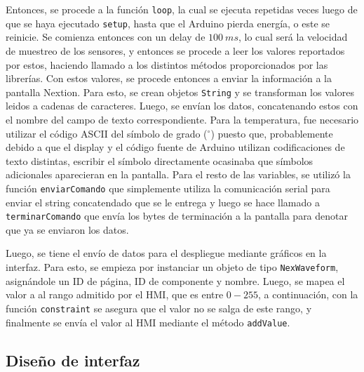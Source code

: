 Entonces, se procede a la función \texttt{loop}, la cual se ejecuta repetidas
veces luego de que se haya ejecutado \texttt{setup}, hasta que el Arduino
pierda energía, o este se reinicie. Se comienza entonces con un delay de $100\
\unit{ms}$, lo cual será la velocidad de muestreo de los sensores, y entonces
se procede a leer los valores reportados por estos, haciendo llamado a los
distintos métodos proporcionados por las librerías. Con estos valores, se
procede entonces a enviar la información a la pantalla Nextion. Para esto, se
crean objetos \texttt{String} y se transforman los valores leidos a cadenas de
caracteres. Luego, se envían los datos, concatenando estos con el nombre del
campo de texto correspondiente. Para la temperatura, fue necesario utilizar el
código ASCII del símbolo de grado ($^{\circ}$) puesto que, probablemente debido
a que el display y el código fuente de Arduino utilizan codificaciones de texto
distintas, escribir el símbolo directamente ocasinaba que símbolos adicionales
aparecieran en la pantalla. Para el resto de las variables, se utilizó la
función \texttt{enviarComando} que simplemente utiliza la comunicación serial
para enviar el string concatendado que se le entrega y luego se hace llamado
a \texttt{terminarComando} que envía los bytes de terminación a la pantalla
para denotar que ya se enviaron los datos.

Luego, se tiene el envío de datos para el despliegue mediante gráficos en
la interfaz. Para esto, se empieza por instanciar un objeto de tipo
\texttt{NexWaveform}, asignándole un ID de página, ID de componente y
nombre. Luego, se mapea el valor a al rango admitido por el HMI, que
es entre $0-255$, a continuación, con la función \texttt{constraint} se
asegura que el valor no se salga de este rango, y finalmente se envía el
valor al HMI mediante el método \texttt{addValue}.

\clearpage
\subsection{Diseño de interfaz}


